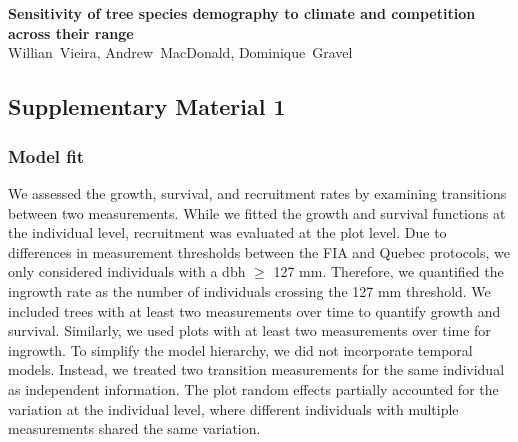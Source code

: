 \graphicspath{{chapter2/}{manuscript/}}

\chapter{\textbf{}}

\begin{center}
\textbf{Sensitivity of tree species demography to climate and
competition across their range} \\
Willian~Vieira, Andrew~MacDonald, Dominique~Gravel
\end{center}

\hypertarget{supplementary-material-1}{%
\section{Supplementary Material 1}\label{supplementary-material-1}}

\hypertarget{sec-model-fit}{%
\subsection{Model fit}\label{sec-model-fit}}

We assessed the growth, survival, and recruitment rates by examining
transitions between two measurements. While we fitted the growth and
survival functions at the individual level, recruitment was evaluated at
the plot level. Due to differences in measurement thresholds between the
FIA and Quebec protocols, we only considered individuals with a dbh
\(\ge\) 127 mm. Therefore, we quantified the ingrowth rate as the number
of individuals crossing the 127 mm threshold. We included trees with at
least two measurements over time to quantify growth and survival.
Similarly, we used plots with at least two measurements over time for
ingrowth. To simplify the model hierarchy, we did not incorporate
temporal models. Instead, we treated two transition measurements for the
same individual as independent information. The plot random effects
partially accounted for the variation at the individual level, where
different individuals with multiple measurements shared the same
variation.\\

